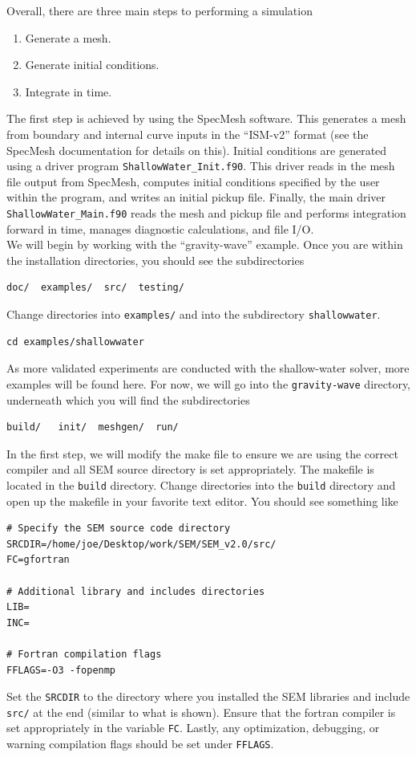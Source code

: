 \documentclass[12pt]{memoir}
\begin{document}
Overall, there are three main steps to performing a simulation
\begin{enumerate}
\item Generate a mesh.
\item Generate initial conditions.
\item Integrate in time.
\end{enumerate}

The first step is achieved by using the SpecMesh software. This generates a mesh from boundary and internal curve inputs in the ``ISM-v2'' format (see the SpecMesh documentation for details on this). Initial conditions are generated using a driver program \texttt{ShallowWater\_Init.f90}. This driver reads in the mesh file output from SpecMesh, computes initial conditions specified by the user within the program, and writes an initial pickup file. Finally, the main driver \texttt{ShallowWater\_Main.f90} reads the mesh and pickup file and performs integration forward in time, manages diagnostic calculations, and file I/O.\\

We will begin by working with the ``gravity-wave'' example. Once you are within the installation directories, you should see the subdirectories
\begin{verbatim}
doc/  examples/  src/  testing/
\end{verbatim}
Change directories into \texttt{examples/} and into the subdirectory \texttt{shallowwater}.
\begin{verbatim}
cd examples/shallowwater
\end{verbatim}
As more validated experiments are conducted with the shallow-water solver, more examples will be found here. For now, we will go into the \texttt{gravity-wave} directory, underneath which you will find the subdirectories
\begin{verbatim}
build/   init/  meshgen/  run/
\end{verbatim}
In the first step, we will modify the make file to ensure we are using the correct compiler and all SEM source directory is set appropriately. The makefile is located in the \texttt{build} directory. Change directories into the \texttt{build} directory and open up the makefile in your favorite text editor. You should see something like 
\begin{verbatim}
# Specify the SEM source code directory
SRCDIR=/home/joe/Desktop/work/SEM/SEM_v2.0/src/
FC=gfortran

# Additional library and includes directories
LIB=
INC= 

# Fortran compilation flags
FFLAGS=-O3 -fopenmp
\end{verbatim}
Set the \texttt{SRCDIR} to the directory where you installed the SEM libraries and include \texttt{src/} at the end (similar to what is shown). Ensure  that the fortran compiler is set appropriately in the variable \texttt{FC}. Lastly, any optimization, debugging, or warning compilation flags should be set under \texttt{FFLAGS}.\\
\end{document}

